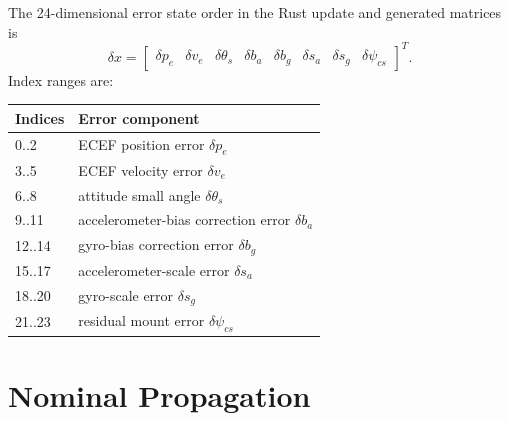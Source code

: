 \documentclass[11pt]{article}
\newcommand{\T}{^{T}}
\begin{document}
The 24-dimensional error state order in the Rust update and generated matrices
is
\begin{equation}
  \delta x =
  \begin{bmatrix}
  \delta p_e &
  \delta v_e &
  \delta\theta_s &
  \delta b_a &
  \delta b_g &
  \delta s_a &
  \delta s_g &
  \delta\psi_{cs}
  \end{bmatrix}\T .
\end{equation}
Index ranges are:
\begin{center}
\begin{tabular}{ll}
\toprule
Indices & Error component \\
\midrule
0..2 & ECEF position error \(\delta p_e\) \\
3..5 & ECEF velocity error \(\delta v_e\) \\
6..8 & attitude small angle \(\delta\theta_s\) \\
9..11 & accelerometer-bias correction error \(\delta b_a\) \\
12..14 & gyro-bias correction error \(\delta b_g\) \\
15..17 & accelerometer-scale error \(\delta s_a\) \\
18..20 & gyro-scale error \(\delta s_g\) \\
21..23 & residual mount error \(\delta\psi_{cs}\) \\
\bottomrule
\end{tabular}
\end{center}

\section{Nominal Propagation}
\end{document}

